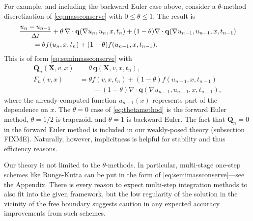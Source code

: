 \documentclass[final,leqno,onefignum,onetabnum]{siamltex1213bueler}
\newcommand\bq{\mathbf{q}}
\newcommand\bQ{\mathbf{Q}}
\newcommand\bX{\mathbf{X}}
\newcommand{\Div}{\nabla\cdot}
\renewcommand{\grad}{\nabla}
\begin{document}
For example, and including the backward Euler case above, consider a $\theta$-method discretization of \eqref{eq:massconserve} with $0\le \theta \le 1$.  The result is
\begin{align}
  &\frac{u_n - u_{n-1}}{\Delta t} + \theta\, \Div \bq(\grad u_n,u_n,x,t_n) + (1-\theta) \Div \bq(\grad u_{n-1},u_{n-1},x,t_{n-1}) \label{eq:thetamethod} \\
  &\qquad =  \theta f(u_n,x,t_n) + (1-\theta) f(u_{n-1},x,t_{n-1}). \notag
\end{align}
This is of form \eqref{eq:semimassconserve} with
\begin{align*}
\bQ_n(\bX,v,x) &= \theta\, \bq(\bX,v,x,t_n), \\
F_n(v,x)       &= \theta f(v,x,t_n) + (1-\theta) f(u_{n-1},x,t_{n-1}) \\
               &\qquad - (1-\theta) \Div \bq(\grad u_{n-1},u_{n-1},x,t_{n-1}),
\end{align*}
where the already-computed function $u_{n-1}(x)$ represents part of the dependence on $x$.  The $\theta=0$ case of \eqref{eq:thetamethod} is the forward Euler method, $\theta=1/2$ is trapezoid, and $\theta=1$ is backward Euler.  The fact that $\bQ_n=0$ in the forward Euler method is included in our weakly-posed theory (subsection FIXME).  Naturally, however, implicitness is helpful for stability and thus efficiency reasons.

Our theory is not limited to the $\theta$-methods.  In particular, multi-stage one-step schemes like Runge-Kutta can be put in the form of \eqref{eq:semimassconserve}---see the Appendix.  There is every reason to expect multi-step integration methods to also fit into the given framework, but the low regularity of the solution in the vicinity of the free boundary suggests caution in any expected accuracy improvements from such schemes.
\end{document}
